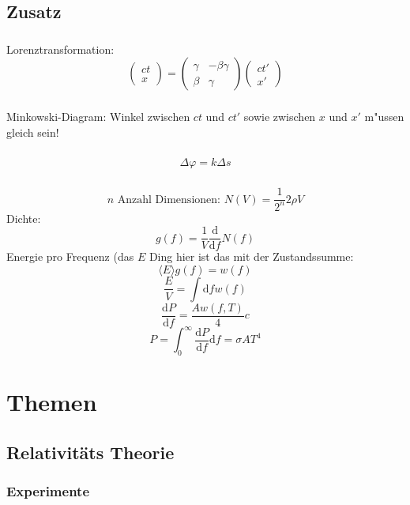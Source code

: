 \documentclass[12pt]{report}
\newcommand{\vphi}{\varphi}
\newcommand{\dd}{\mathrm{d}}
\begin{document}
\section{Zusatz}

\subsection{}
Lorenztransformation:
\[\begin{pmatrix}ct\\x\end{pmatrix}=\begin{pmatrix}\gamma&-\beta\gamma\\\beta&\gamma\end{pmatrix}\begin{pmatrix}ct'\\x'\end{pmatrix}\]

\subsection{}
Minkowski-Diagram:
Winkel zwischen $ct$ und $ct'$ sowie zwischen $x$ und $x'$ m"ussen gleich sein!

\subsection{}

\[\Delta\vphi=k\Delta s\]

\subsection{}

\[n\textrm{ Anzahl Dimensionen: }N(V)=\frac{1}{2^n}2\rho V\]
Dichte:
\[g(f)=\frac{1}{V}\frac{\dd}{\dd f}N(f)\]
Energie pro Frequenz (das $E$ Ding hier ist das mit der Zustandssumme:
\[\langle E\rangle g(f)=w(f)\]
\[\frac{E}{V}=\int\dd fw(f)\]
\[\frac{\dd P}{\dd f}=\frac{Aw(f,T)}{4}c\]
\[P=\int_0^\infty\frac{\dd P}{\dd f}\dd f=\sigma AT^4\]

\chapter{Themen}

\section{Relativitäts Theorie}

\subsection{Experimente}
\end{document}
